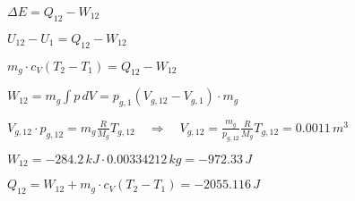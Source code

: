 \( \Delta E = Q_{12} - W_{12} \)

\( U_{12} - U_1 = Q_{12} - W_{12} \)

\( m_g \cdot c_V (T_2 - T_1) = Q_{12} - W_{12} \)

\( W_{12} = m_g \int p \, dV = p_{g,1} (V_{g,12} - V_{g,1}) \cdot m_g \)

\( V_{g,12} \cdot p_{g,12} = m_g \frac{R}{M_g} T_{g,12} \quad \Rightarrow \quad V_{g,12} = \frac{m_g}{p_{g,12}} \frac{R}{M_g} T_{g,12} = 0.0011 \, m^3 \)

\( W_{12} = -284.2 \, kJ \cdot 0.00334212 \, kg = -972.33 \, J \)

\( Q_{12} = W_{12} + m_g \cdot c_V (T_2 - T_1) = -2055.116 \, J \)